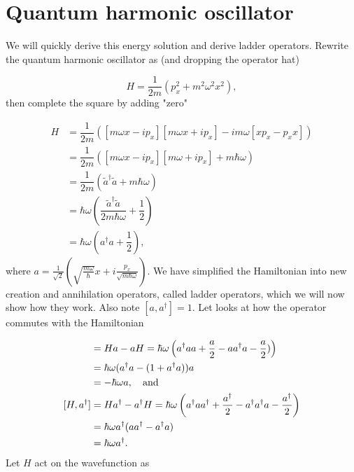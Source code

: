 \section{Quantum harmonic oscillator}
\label{appendix:qho}

We will quickly derive this energy solution and derive ladder operators.
Rewrite the quantum harmonic oscillator as (and dropping the operator hat)

\begin{equation*}
  H = \dfrac{1}{2m} \left( p_x^2 + m^2 \omega^2 x^2 \right),
\end{equation*}
then complete the square by adding "zero"

\begin{align}
  H &= \dfrac{1}{2m} \left( [m\omega x - i p_x] [m\omega x + i p_x] -im\omega[xp_x - p_x x] \right) \nonumber \\
  &= \dfrac{1}{2m} \left( [m\omega x - i p_x] [m\omega + i p_x] + m \hbar \omega \right) \nonumber \\
  &= \dfrac{1}{2m} \left( \tilde{a}^{\dagger} \tilde{a} + m\hbar \omega \right) \nonumber \\
  &= \hbar \omega \left( \dfrac{\tilde{a}^{\dagger} \tilde{a} }{2m\hbar \omega} + \dfrac{1}{2} \right) \nonumber \\
  &= \hbar \omega \left( a^{\dagger} a + \dfrac{1}{2} \right),
\end{align}
where $a = \tfrac{1}{\sqrt{2}} \left(\sqrt{\tfrac{m\omega}{\hbar}} x + i \tfrac{p_x}{\sqrt{m\hbar\omega}} \right)$.
We have simplified the Hamiltonian into new creation and annihilation operators, called ladder operators, which we will now show how they work.
Also note $[a, a^{\dagger}] = 1$.
Let looks at how the operator commutes with the Hamiltonian

\begin{align}
  [H, a] &= Ha - aH = \hbar \omega \left( \ca a a + \dfrac{a}{2} - a \ca a - \dfrac{a}{2}) \right) \nonumber \\
      &= \hbar \omega (\ca a  - (1 + \ca a) ) a \nonumber \\
      &= - \hbar \omega a, \quad \text{and} \\
  [H, \ca] &= H\ca - \ca H = \hbar \omega \left( \ca a \ca + \dfrac{\ca}{2} - \ca \ca a - \dfrac{\ca}{2}\right) \nonumber \\
      &= \hbar \omega \ca ( a\ca - \ca a) \nonumber \\
      &= \hbar \omega \ca.
\end{align}
Let $H$ act on the wavefunction as

